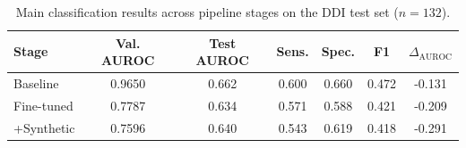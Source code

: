 \begin{table}[htbp]
\centering
\caption{Main classification results across pipeline stages on the DDI test set ($n=132$).}
\label{tab:main_results}
\begin{tabular}{lcccccc}
\toprule
\textbf{Stage} & Val. AUROC & Test AUROC & Sens. & Spec. & F1 & $\Delta_{\text{AUROC}}$ \\
\midrule
Baseline & 0.9650 & 0.662 & 0.600 & 0.660 & 0.472 & -0.131 \\
Fine-tuned & 0.7787 & 0.634 & 0.571 & 0.588 & 0.421 & -0.209 \\
+Synthetic & 0.7596 & 0.640 & 0.543 & 0.619 & 0.418 & -0.291 \\
\bottomrule
\end{tabular}
\end{table}
